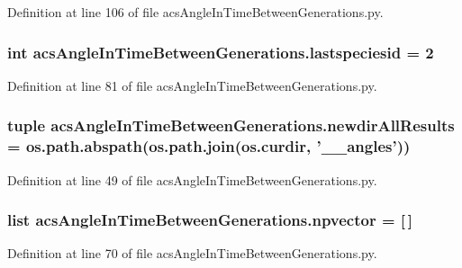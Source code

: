 Definition at line 106 of file acs\-Angle\-In\-Time\-Between\-Generations.\-py.

\hypertarget{a00090_ab78a312c378cd8ff7fc988f15165b0af}{
\subsubsection[{lastspeciesid}]{\setlength{\rightskip}{0pt plus 5cm}int acs\-Angle\-In\-Time\-Between\-Generations.\-lastspeciesid = 2}}\label{a00090_ab78a312c378cd8ff7fc988f15165b0af}


Definition at line 81 of file acs\-Angle\-In\-Time\-Between\-Generations.\-py.

\hypertarget{a00090_ae87ac48e6ef93d79f64689af63d1681f}{
\subsubsection[{newdir\-All\-Results}]{\setlength{\rightskip}{0pt plus 5cm}tuple acs\-Angle\-In\-Time\-Between\-Generations.\-newdir\-All\-Results = os.\-path.\-abspath(os.\-path.\-join(os.\-curdir, '\-\_\-\_\-angles'))}}\label{a00090_ae87ac48e6ef93d79f64689af63d1681f}


Definition at line 49 of file acs\-Angle\-In\-Time\-Between\-Generations.\-py.

\hypertarget{a00090_a5ba3601fadf52ac203118473b6c4db3e}{
\subsubsection[{npvector}]{\setlength{\rightskip}{0pt plus 5cm}list acs\-Angle\-In\-Time\-Between\-Generations.\-npvector = \mbox{[}$\,$\mbox{]}}}\label{a00090_a5ba3601fadf52ac203118473b6c4db3e}


Definition at line 70 of file acs\-Angle\-In\-Time\-Between\-Generations.\-py.

